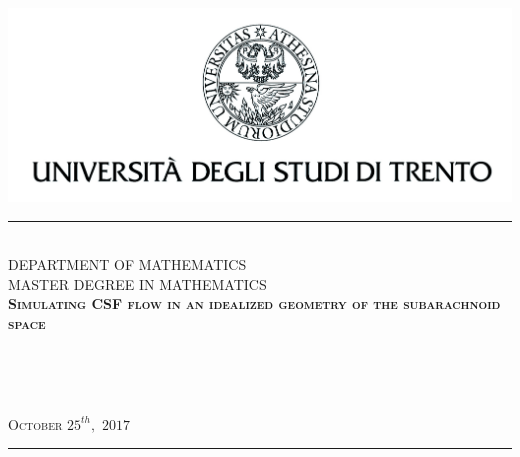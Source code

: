 \documentclass[a4paper,11pt,oneside]{book}
\begin{document}

\begin{titlepage}
\begin{center}
\vspace*{-2.7cm}
\includegraphics{images/aquila_nome}
\\
\rule{\textwidth}{1pt}
\\[0.5cm]
{\Large DEPARTMENT OF MATHEMATICS}
\\[0.35cm]
{\Large MASTER DEGREE IN MATHEMATICS}
\\[3.5cm]
\textsc{\huge \textbf{Simulating CSF flow in an idealized geometry of the subarachnoid space}}
\\[4cm]
\begin{minipage}{0.5\textwidth}
\\
\end{minipage}
\begin{minipage}{0.45\textwidth}
\vspace{-3.2cm}
 \\
\end{minipage}

\vspace*{\fill}
{\textsc{\normalsize October $25^{th},$ $2017$}}
\rule{\textwidth}{1pt}


\end{center}
\phantom{}
\end{titlepage}
\end{document}
